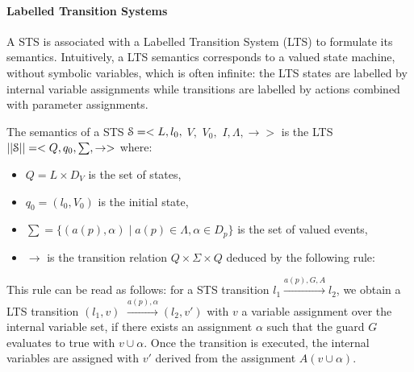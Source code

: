 \paragraph{Labelled Transition Systems}

A STS is associated with a Labelled Transition System (LTS) to
formulate its semantics. Intuitively, a LTS semantics corresponds
to a valued state machine, without symbolic variables, which is
often infinite: the LTS states are labelled by internal variable
assignments while transitions are labelled by actions combined
with parameter assignments.

\begin{definition}
    The semantics of a STS $\EuScript{S}=<L,l_0,$ $V,$ $V_0,$
    $I,\Lambda,\rightarrow>$ is the LTS
    $||\EuScript{S}||=<Q,q_0,\sum,\rightarrow>$ where:

	\begin{itemize}

		\item $Q=L \times D_V$ is the set of states,

        \item $q_0=(l_0,V_0)$ is the initial state,

		\item $\sum=\{(a(p),\alpha)  \mid  a(p)\in\Lambda, \alpha \in
		D_p\}$ is the set of valued events,

        \item $\rightarrow$ is the transition relation $Q \times
        \Sigma \times Q$ deduced by the following rule:\\
	\end{itemize}
	\begin{center}
	\end{center}

	\label{def:semantics}
\end{definition}

This rule can be read as follows: for a STS transition $l_1
\xrightarrow{a(p),G,A}l_2$, we obtain a LTS transition $(l_1,v)$
$\xrightarrow{a(p),\alpha} (l_2,v')$ with $v$ a variable
assignment over the internal variable set, if there exists an
assignment $\alpha$ such that the guard $G$ evaluates to true
with $v \cup \alpha$. Once the transition is executed, the
internal variables are assigned with $v'$ derived from the
assignment $A(v \cup \alpha)$.

